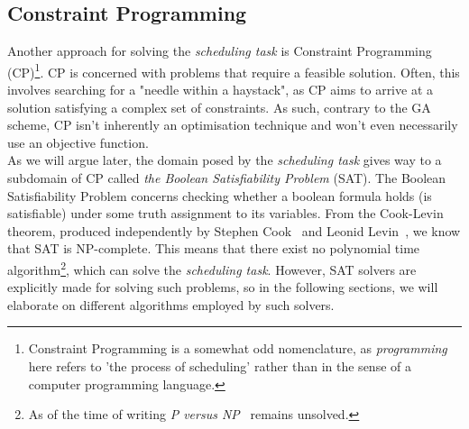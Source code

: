 \subsection{Constraint Programming}
Another approach for solving the \textit{scheduling task} is Constraint Programming (CP)\footnote{Constraint Programming is a somewhat odd nomenclature, as \textit{programming} here refers to 'the process of scheduling' rather than in the sense of a computer programming language.}. CP is concerned with problems that require a feasible solution. Often, this involves searching for a "needle within a haystack", as CP aims to arrive at a solution satisfying a complex set of constraints. As such, contrary to the GA scheme, CP isn't inherently an optimisation technique and won't even necessarily use an objective function.
\\
As we will argue later, the domain posed by the \textit{scheduling task} gives way to a subdomain of CP called \textit{the Boolean Satisfiability Problem} (SAT). The Boolean Satisfiability Problem concerns checking whether a boolean formula holds (is satisfiable) under some truth assignment to its variables. From the Cook-Levin theorem, produced independently by Stephen Cook~\cite{cook-bool-SAT} and Leonid Levin~\cite{Levin-bool-SAT}, we know that SAT is NP-complete. This means that there exist no polynomial time algorithm\footnote{As of the time of writing \textit{P versus NP}~\cite{Wiki-P-vs-NP} remains unsolved.}, which can solve the \textit{scheduling task}. However, SAT solvers are explicitly made for solving such problems, so in the following sections, we will elaborate on different algorithms employed by such solvers.

